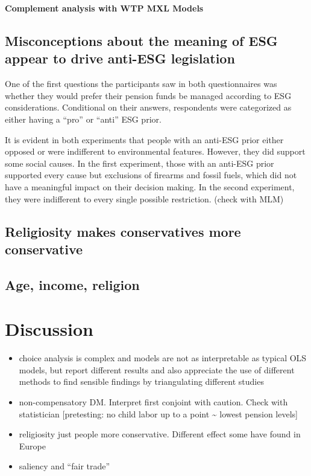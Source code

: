 \documentclass[
  12pt,
]{article}
\begin{document}
\textbf{Complement analysis with WTP MXL Models}

\hypertarget{misconceptions-about-the-meaning-of-esg-appear-to-drive-anti-esg-legislation}{%
\subsection{Misconceptions about the meaning of ESG appear to drive anti-ESG legislation}\label{misconceptions-about-the-meaning-of-esg-appear-to-drive-anti-esg-legislation}}

One of the first questions the participants saw in both questionnaires was whether they would prefer their pension funds be managed according to ESG considerations. Conditional on their answers, respondents were categorized as either having a ``pro'' or ``anti'' ESG prior.

It is evident in both experiments that people with an anti-ESG prior either opposed or were indifferent to environmental features. However, they did support some social causes. In the first experiment, those with an anti-ESG prior supported every cause but exclusions of firearms and fossil fuels, which did not have a meaningful impact on their decision making. In the second experiment, they were indifferent to every single possible restriction. (check with MLM)

\hypertarget{religiosity-makes-conservatives-more-conservative}{%
\subsection{Religiosity makes conservatives more conservative}\label{religiosity-makes-conservatives-more-conservative}}

\hypertarget{age-income-religion}{%
\subsection{Age, income, religion}\label{age-income-religion}}

\hypertarget{discussion}{%
\section{Discussion}\label{discussion}}

\begin{itemize}
\item
  choice analysis is complex and models are not as interpretable as typical OLS models, but report different results and also appreciate the use of different methods to find sensible findings by triangulating different studies
\item
  non-compensatory DM. Interpret first conjoint with caution. Check with statistician {[}pretesting: no child labor up to a point \textasciitilde{} lowest pension levels{]}
\item
  religiosity just people more conservative. Different effect some have found in Europe
\item
  saliency and ``fair trade''
\end{itemize}
\end{document}
